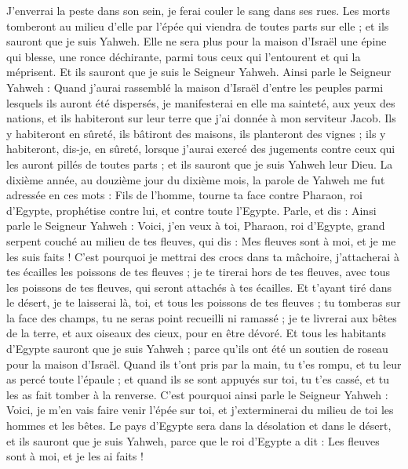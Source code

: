 \begin{multicols}{2}
J'enverrai la peste dans son sein, je ferai couler le sang dans ses rues. Les morts tomberont au milieu d'elle par l'épée qui viendra de toutes parts sur elle ; et ils sauront que je suis Yahweh.
Elle ne sera plus pour la maison d'Israël une épine qui blesse, une ronce déchirante, parmi tous ceux qui l'entourent et qui la méprisent. Et ils sauront que je suis le Seigneur Yahweh.
Ainsi parle le Seigneur Yahweh : Quand j'aurai rassemblé la maison d'Israël d'entre les peuples parmi lesquels ils auront été dispersés, je manifesterai en elle ma sainteté, aux yeux des nations, et ils habiteront sur leur terre que j'ai donnée à mon serviteur Jacob.
Ils y habiteront en sûreté, ils bâtiront des maisons, ils planteront des vignes ; ils y habiteront, dis-je, en sûreté, lorsque j'aurai exercé des jugements contre ceux qui les auront pillés de toutes parts ; et ils sauront que je suis Yahweh leur Dieu.
\VerseOne{}La dixième année, au douzième jour du dixième mois, la parole de Yahweh me fut adressée en ces mots :
Fils de l'homme, tourne ta face contre Pharaon, roi d'Egypte, prophétise contre lui, et contre toute l'Egypte.
Parle, et dis : Ainsi parle le Seigneur Yahweh : Voici, j'en veux à toi, Pharaon, roi d'Egypte, grand serpent couché au milieu de tes fleuves, qui dis : Mes fleuves sont à moi, et je me les suis faits !
C'est pourquoi je mettrai des crocs dans ta mâchoire, j'attacherai à tes écailles les poissons de tes fleuves ; je te tirerai hors de tes fleuves, avec tous les poissons de tes fleuves, qui seront attachés à tes écailles.
Et t'ayant tiré dans le désert, je te laisserai là, toi, et tous les poissons de tes fleuves ; tu tomberas sur la face des champs, tu ne seras point recueilli ni ramassé ; je te livrerai aux bêtes de la terre, et aux oiseaux des cieux, pour en être dévoré.
Et tous les habitants d'Egypte sauront que je suis Yahweh ; parce qu'ils ont été un soutien de roseau pour la maison d'Israël.
Quand ils t'ont pris par la main, tu t'es rompu, et tu leur as percé toute l'épaule ; et quand ils se sont appuyés sur toi, tu t'es cassé, et tu les as fait tomber à la renverse.
C'est pourquoi ainsi parle le Seigneur Yahweh : Voici, je m'en vais faire venir l'épée sur toi, et j'exterminerai du milieu de toi les hommes et les bêtes.
Le pays d'Egypte sera dans la désolation et dans le désert, et ils sauront que je suis Yahweh, parce que le roi d'Egypte a dit : Les fleuves sont à moi, et je les ai faits !

\end{multicols}
